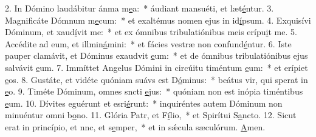 2. In Dómino laudábitur ánma m\uline{e}a:~* áudiant mansuéti, et læt\uline{é}ntur.
3. Magnificáte Dómnum m\uline{e}cum:~* et exaltémus nomen ejus in id\uline{í}psum.
4. Exquisívi Dóminum, et xaud\uline{í}vit me:~* et ex ómnibus tribulatiónibus meis erípu\uline{i}t me.
5. Accédite ad eum, et illmin\uline{á}mini:~* et fácies vestræ non confund\uline{é}ntur.
6. Iste pauper clamávit, et Dóminus exaudvit \uline{e}um:~* et de ómnibus tribulatiónibus ejus salvávit \uline{e}um.
7. Immíttet Angelus Dómini in circúitu timéntum \uline{e}um:~* et erípiet \uline{e}os.
8. Gustáte, et vidéte quóniam suávs est D\uline{ó}minus:~* beátus vir, qui sperat in \uline{e}o.
9. Timéte Dóminum, omnes sncti \uline{e}jus:~* quóniam non est inópia timéntibus \uline{e}um.
10. Dívites eguérunt et esri\uline{é}runt:~* inquiréntes autem Dóminum non minuéntur omni b\uline{o}no.
11. Glória Patr, et F\uline{í}lio,~* et Spirítui S\uline{a}ncto.
12. Sicut erat in princípio, et nnc, et s\uline{e}mper,~* et in sǽcula sæculórum. \uline{A}men.
